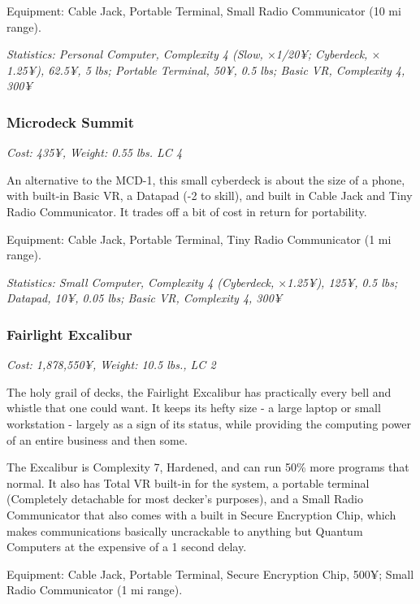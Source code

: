 \begin{multicols*}{3}
	Equipment: Cable Jack, Portable Terminal, Small Radio Communicator (10 mi range).
	
	\textit{\textcolor{OliveGreen}{Statistics: Personal Computer, Complexity 4 (Slow, \(\times\)1/20¥; Cyberdeck, \(\times\)1.25¥), 62.5¥, 5 lbs; Portable Terminal, 50¥, 0.5 lbs; Basic VR, Complexity 4, 300¥}}
	
	\subsubsection*{Microdeck Summit}
	
	\textit{\textcolor{NavyBlue}{Cost: 435¥, Weight: 0.55 lbs. LC 4}}
	
	An alternative to the MCD-1, this small cyberdeck is about the size of a phone, with built-in Basic VR, a Datapad (-2 to skill), and built in Cable Jack and Tiny Radio Communicator. It trades off a bit of cost in return for portability.
	
	Equipment: Cable Jack, Portable Terminal, Tiny Radio Communicator (1 mi range).
	
	\textit{\textcolor{OliveGreen}{Statistics: Small Computer, Complexity 4 (Cyberdeck, \(\times\)1.25¥), 125¥, 0.5 lbs; Datapad, 10¥, 0.05 lbs; Basic VR, Complexity 4, 300¥}}
	
	\subsubsection*{Fairlight Excalibur}
	
	\textit{\textcolor{NavyBlue}{Cost: 1,878,550¥, Weight: 10.5 lbs., LC 2}}
	
	The holy grail of decks, the Fairlight Excalibur has practically every bell and whistle that one could want. It keeps its hefty size - a large laptop or small workstation - largely as a sign of its status, while providing the computing power of an entire business and then some.
	
	The Excalibur is Complexity 7, Hardened, and can run 50\% more programs that normal. It also has Total VR built-in for the system, a portable terminal (Completely detachable for most decker's purposes), and a Small Radio Communicator that also comes with a built in Secure Encryption Chip, which makes communications basically uncrackable to anything but Quantum Computers at the expensive of a 1 second delay.
	
	Equipment: Cable Jack, Portable Terminal, Secure Encryption Chip, 500¥; Small Radio Communicator (1 mi range).
	

\end{multicols*}
